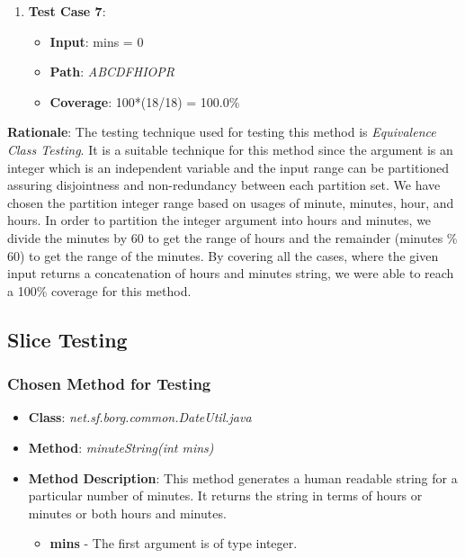 \documentclass[fontsize=12pt,paper=letter,twoside]{scrartcl}
\begin{document}
\begin{enumerate}
\item \textbf{Test Case 7}:
\begin{itemize}
\item \textbf{Input}: mins = 0
\item \textbf{Path}: \emph{ABCDFHIOPR}
\item \textbf{Coverage}: 100*(18/18) = 100.0\%
\end{itemize}

\end{enumerate}

\noindent \textbf{Rationale}: The testing technique used for testing this method is \emph{Equivalence Class Testing}. It is a suitable technique for this method since the argument is an integer which is an independent variable and the input range can be partitioned assuring disjointness and non-redundancy between each partition set. We have chosen the partition integer range based on usages of minute, minutes, hour, and hours. In order to partition the integer argument into hours and minutes, we divide the minutes by 60 to get the range of hours and the remainder (minutes \% 60) to get the range of the minutes. By covering all the cases, where the given input returns a concatenation of hours and minutes string, we were able to reach a 100\% coverage for this method.

\newpage
\subsection{Slice Testing}

\subsubsection{Chosen Method for Testing}

\begin{itemize}
\item \textbf{Class}: \emph{net.sf.borg.common.DateUtil.java}
\item \textbf{Method}: \emph{minuteString(int mins)}
\item \textbf{Method Description}:
This method generates a human readable string for a particular number of minutes. It returns the string in terms of hours or minutes or both hours and minutes.
\begin{itemize}
\item \textbf{mins} - The first argument is of type integer.
\end{itemize}
\end{itemize}
\end{document}
